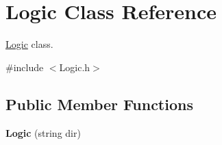 \hypertarget{class_logic}{\section{Logic Class Reference}
\label{class_logic}
}


\hyperlink{class_logic}{Logic} class.  




{\ttfamily \#include $<$Logic.\+h$>$}

\subsection*{Public Member Functions}
\begin{DoxyCompactItemize}
\item 
\hypertarget{class_logic_ae5d9fec13e88b0182b3d45f33404f826}{{\bfseries Logic} (string dir)}\label{class_logic_ae5d9fec13e88b0182b3d45f33404f826}

\end{DoxyCompactItemize}
